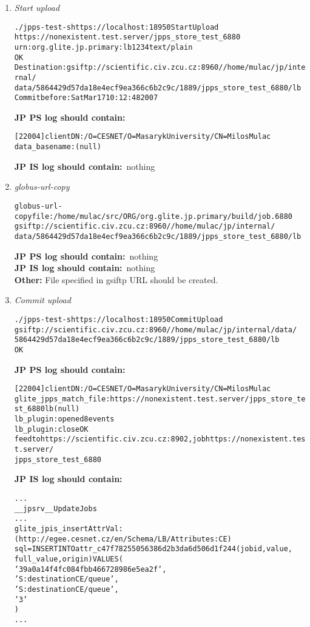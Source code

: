 \documentclass{egee}
\def\jpps{\noindent\textbf{JP PS log should contain:}}
\def\jpis{\noindent\textbf{JP IS log should contain:}}
\begin{document}
\begin{enumerate}
 \item \emph{Start upload}
  \begin{alltt}
	./jpps-test -s https://localhost:18950 StartUpload 
	https://nonexistent.test.server/jpps_store_test_6880 
	urn:org.glite.jp.primary:lb 1234 text/plain
	OK
	Destination: gsiftp://scientific.civ.zcu.cz:8960//home/mulac/jp/internal/
	data/5864429d57da18e4ecf9ea366c6b2c9c/1889/jpps_store_test_6880/lb
	Commit before: Sat Mar 17 10:12:48 2007
  \end{alltt}
  \jpps\
  \begin{alltt}
	[22004] client DN: /O=CESNET/O=Masaryk University/CN=Milos Mulac
	data_basename: (null)
  \end{alltt}
  \jpis\
	nothing
 \item \emph{globus-url-copy}
  \begin{alltt}
	globus-url-copy file:/home/mulac/src/ORG/org.glite.jp.primary/build/job.6880
	gsiftp://scientific.civ.zcu.cz:8960//home/mulac/jp/internal/
	data/5864429d57da18e4ecf9ea366c6b2c9c/1889/jpps_store_test_6880/lb
  \end{alltt}
  \jpps\
	nothing \\
  \jpis\
	nothing \\
  \noindent\textbf{Other:}
	File specified in gsiftp URL should be created.
 \item \emph{Commit upload}
  \begin{alltt}
	./jpps-test -s https://localhost:18950 CommitUpload 
	gsiftp://scientific.civ.zcu.cz:8960//home/mulac/jp/internal/data/
	5864429d57da18e4ecf9ea366c6b2c9c/1889/jpps_store_test_6880/lb
	OK
  \end{alltt}
  \jpps\
  \begin{alltt}
	[22004] client DN: /O=CESNET/O=Masaryk University/CN=Milos Mulac
	glite_jpps_match_file: https://nonexistent.test.server/jpps_store_test_6880 lb (null)
	lb_plugin: opened 8 events
	lb_plugin: close OK
	feed to https://scientific.civ.zcu.cz:8902, job https://nonexistent.test.server/
	jpps_store_test_6880
  \end{alltt}
  \jpis\
  \begin{alltt}
	...
	__jpsrv__UpdateJobs
	...
	glite_jpis_insertAttrVal: (http://egee.cesnet.cz/en/Schema/LB/Attributes:CE) 
	sql=INSERT INTO attr_c47f78255056386d2b3da6d506d1f244 (jobid, value, 
	full_value, origin) VALUES (
        '39a0a14f4fc084fbb466728986e5ea2f',
        'S:destination CE/queue',
        'S:destination CE/queue',
        '3'
	)
	...
  \end{alltt}


\end{enumerate}
\end{document}
